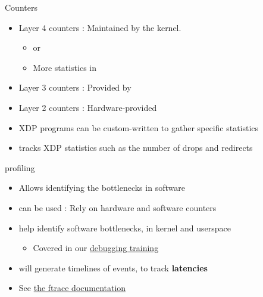 \begin{frame}{Counters}
	\begin{itemize}
		\item Layer 4 counters : Maintained by the kernel.
			\begin{itemize}
				\item {} or 
				\item More statistics in 
			\end{itemize}
		\item Layer 3 counters : Provided by 
		\item Layer 2 counters : Hardware-provided
		\item XDP programs can be custom-written to gather specific statistics
		\item {} tracks XDP statistics such as the number of drops and redirects
	\end{itemize}
\end{frame}

\begin{frame}{profiling}
	\begin{itemize}
		\item Allows identifying the bottlenecks in software
		\item {} can be used : Rely on hardware and software counters
		\item {} help identify software bottlenecks, in kernel and userspace
			\begin{itemize}
				\item Covered in our \href{https://bootlin.com/training/debugging/}{debugging training}
			\end{itemize}
		\item {} will generate timelines of events, to track \textbf{latencies}
		\item See \href{https://docs.kernel.org/trace/ftrace.html}{the ftrace documentation}
	\end{itemize}
\end{frame}

